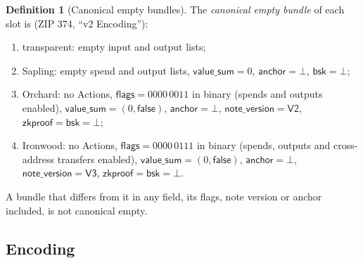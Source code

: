 \documentclass[11pt,a4paper]{article}
\theoremstyle{definition}
\newtheorem{definition}[theorem]{Definition}
\begin{document}
\begin{definition}[Canonical empty bundles]\label{def:pczt-empty}
The \emph{canonical empty bundle} of each slot is (ZIP 374, ``v2
Encoding''):
\begin{enumerate}[label=(\roman*)]
\item transparent: empty input and output lists;
\item Sapling: empty spend and output lists, $\mathsf{value\_sum} = 0$,
  $\mathsf{anchor} = \bot$, $\mathsf{bsk} = \bot$;
\item Orchard: no Actions, $\mathsf{flags} = 0000\,0011$ in binary (spends
  and outputs enabled), $\mathsf{value\_sum} = (0, \mathsf{false})$,
  $\mathsf{anchor} = \bot$, $\mathsf{note\_version} = \mathsf{V2}$,
  $\mathsf{zkproof} = \mathsf{bsk} = \bot$;
\item Ironwood: no Actions, $\mathsf{flags} = 0000\,0111$ in binary
  (spends, outputs and cross-address transfers enabled),
  $\mathsf{value\_sum} = (0, \mathsf{false})$, $\mathsf{anchor} = \bot$,
  $\mathsf{note\_version} = \mathsf{V3}$, $\mathsf{zkproof} = \mathsf{bsk}
  = \bot$.
\end{enumerate}
A bundle that differs from it in any field, its flags, note version or
anchor included, is not canonical empty.
\end{definition}

\subsection{Encoding}\label{sec:pczt-encoding}
\end{document}
